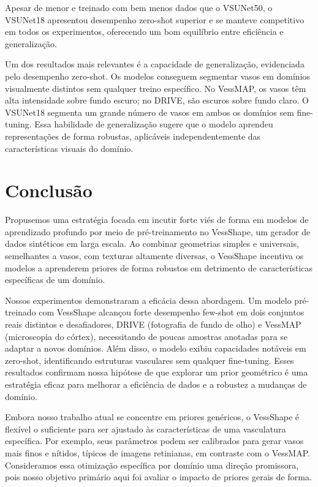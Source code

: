 \documentclass[%
reprint,
nofootinbib,
 amsmath,amssymb,
aps,
floatfix,
superscriptaddress,
showkeys,
longbibliography
]{revtex4-1}
\begin{document}
Apesar de menor e treinado com bem menos dados que o VSUNet50, o VSUNet18 apresentou desempenho zero-shot superior e se manteve competitivo em todos os experimentos, oferecendo um bom equilíbrio entre eficiência e generalização.

Um dos resultados mais relevantes é a capacidade de generalização, evidenciada pelo desempenho zero-shot. Os modelos conseguem segmentar vasos em domínios visualmente distintos sem qualquer treino específico. No VessMAP, os vasos têm alta intensidade sobre fundo escuro; no DRIVE, são escuros sobre fundo claro. O VSUNet18 segmenta um grande número de vasos em ambos os domínios sem fine-tuning. Essa habilidade de generalização sugere que o modelo aprendeu representações de forma robustas, aplicáveis independentemente das características visuais do domínio.



\section{Conclusão}
\label{s:conclusion}

Propusemos uma estratégia focada em incutir forte viés de forma em modelos de aprendizado profundo por meio de pré-treinamento no VessShape, um gerador de dados sintéticos em larga escala. Ao combinar geometrias simples e universais, semelhantes a vasos, com texturas altamente diversas, o VessShape incentiva os modelos a aprenderem priores de forma robustos em detrimento de características específicas de um domínio.

Nossos experimentos demonstraram a eficácia dessa abordagem. Um modelo pré-treinado com VessShape alcançou forte desempenho few-shot em dois conjuntos reais distintos e desafiadores, DRIVE (fotografia de fundo de olho) e VessMAP (microscopia do córtex), necessitando de poucas amostras anotadas para se adaptar a novos domínios. Além disso, o modelo exibiu capacidades notáveis em zero-shot, identificando estruturas vasculares sem qualquer fine-tuning. Esses resultados confirmam nossa hipótese de que explorar um prior geométrico é uma estratégia eficaz para melhorar a eficiência de dados e a robustez a mudanças de domínio.

Embora nosso trabalho atual se concentre em priores genéricos, o VessShape é flexível o suficiente para ser ajustado às características de uma vasculatura específica. Por exemplo, seus parâmetros podem ser calibrados para gerar vasos mais finos e nítidos, típicos de imagens retinianas, em contraste com o VessMAP. Consideramos essa otimização específica por domínio uma direção promissora, pois nosso objetivo primário aqui foi avaliar o impacto de priores gerais de forma.
\end{document}
